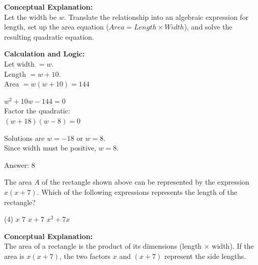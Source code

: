 \documentclass[11pt,paper=a4,answers]{exam}
\begin{document}
\begin{questions}
\begin{solution}
\textbf{Conceptual Explanation:} \\
Let the width be $w$. Translate the relationship into an algebraic expression for length, set up the area equation ($Area = Length \times Width$), and solve the resulting quadratic equation.

\vspace{20pt}

\textbf{Calculation and Logic:} \\
Let width $= w$. \\
Length $= w + 10$. \\
Area $= w(w + 10) = 144$

\vspace{10pt}

$w^2 + 10w - 144 = 0$ \\
Factor the quadratic: \\
$(w + 18)(w - 8) = 0$

\vspace{10pt}

Solutions are $w = -18$ or $w = 8$. \\
Since width must be positive, $w = 8$.

\vspace{25pt}

Answer: \colorbox{yellow!100}{8}
\end{solution}

\vspace{40pt}

\question
\begin{center}
\end{center}
The area $A$ of the rectangle shown above can be represented by the expression $x(x+7)$. Which of the following expressions represents the length of the rectangle?
\begin{tasks}(4)
    \task $x$
    \task $7$
    \task $x+7$
    \task $x^2+7x$
\end{tasks}

\begin{solution}
\textbf{Conceptual Explanation:} \\
The area of a rectangle is the product of its dimensions (length $\times$ width). If the area is $x(x+7)$, the two factors $x$ and $(x+7)$ represent the side lengths.


\end{solution}
\end{questions}
\end{document}
